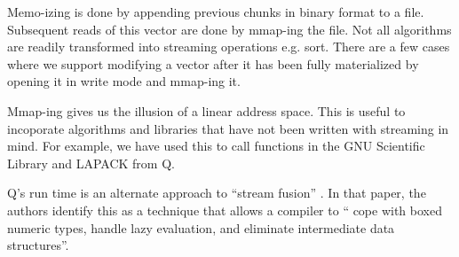 Memo-izing is done by appending previous chunks in binary format to a file.
Subsequent reads of this vector are done by mmap-ing the file. Not all
algorithms are readily transformed into streaming operations e.g. sort. There
are a few cases where we support modifying a vector after it has been fully
materialized by opening it in write mode and mmap-ing it.

Mmap-ing gives us the illusion of a linear address space. This is useful to
incoporate algorithms and libraries that have not been written with streaming in
mind. For example, we have used this to call functions in the GNU Scientific
Library and LAPACK from Q.

Q's run time is an alternate approach to ``stream fusion''
\cite{Mainland2017}. In
that paper, the authors identify this as a technique that allows a compiler to
`` cope with boxed numeric types, handle lazy evaluation, and
eliminate intermediate data structures''.
